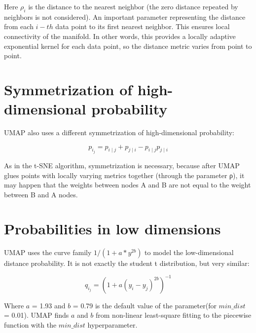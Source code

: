 \noindent Here $\rho_i$ is the distance to the nearest neighbor (the zero distance repeated by neighbors is not considered). An important parameter representing the distance from each $i-th$ data point to its first nearest neighbor. This ensures local connectivity of the manifold. In other words, this provides a locally adaptive exponential kernel for each data point, so the distance metric varies from point to point. \\

\section{Symmetrization of high-dimensional probability}

UMAP also uses a different symmetrization of high-dimensional probability:

\begin{equation*}
    {p_i_j} = p_{i\mid j} + p_{j\mid i} - p_{i\mid j}p_{j\mid i}
\end{equation*}

\noindent As in the t-SNE algorithm, symmetrization is necessary, because after UMAP glues points with locally varying metrics together (through the parameter ρ), it may happen that the weights between nodes A and B are not equal to the weight between B and A nodes.

\section{Probabilities in low dimensions}

\noindent  UMAP uses the curve family $1/(1+ a * y ^{2b})$ to model the low-dimensional distance probability. It is not exactly the student t distribution, but very similar:

\begin{equation*}
    {q_i_j} = (1 + a(y_i - y_j)^{2b} )^{-1}
\end{equation*}

\noindent Where $a$ = 1.93 and $b$ = 0.79 is the default value of the parameter(for $min\_dist$ = 0.01). UMAP finds $a$ and $b$ from non-linear least-square fitting to the piecewise function with the $min\_dist$ hyperparameter.\\

